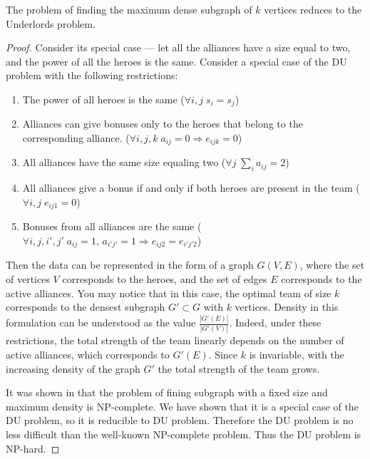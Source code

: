 \documentclass[smallextended]{svjour3}       %
\begin{document}
\begin{theorem}
\label{MEWC_DU}
The problem of finding the maximum dense subgraph of $k$ vertices reduces to the Underlords problem.
\end{theorem}
\begin{proof}

Consider its special case --- let all the alliances have a size equal to two, and the power of all the heroes is the same. Consider a special case of the DU problem with the following restrictions:

\begin{enumerate}
    \item The power of all heroes is the same ($\forall i, j \; s_i=s_j$)
    \item Alliances can give bonuses only to the heroes that belong to the corresponding alliance. ($\forall i, j, k \; a_{ij}=0 \Longrightarrow e_{ijk} = 0$)
    
    \item All alliances have the same size equaling two ($\forall j \; \sum_i a_{ij}=2 $)
    \item All alliances give a bonus if and only if both heroes are present in the team ($\forall i, j \; e_{ij1}=0$)
    \item Bonuses from all alliances are the same ($\forall i, j, i', j' \; a_{ij}=1,\, a_{i' j'}=1 \Longrightarrow e_{ij2}=e_{i' j' 2}$)
\end{enumerate}

Then the data can be represented in the form of a graph $G(V, E) $, where the set of vertices $ V $ corresponds to the heroes, and the set of edges $E$ corresponds to the active alliances. You may notice that in this case, the optimal team of size $ k $ corresponds to the densest subgraph $ G' \subset G $ with $ k $ vertices. Density in this formulation can be understood as the value $ \frac{|G'(E)|}{|G'(V)|} $. Indeed, under these restrictions, the total strength of the team linearly depends on the number of active alliances, which corresponds to $ G'(E)$. Since $ k $ is invariable, with the increasing density of the graph $ G '$ the total strength of the team grows.

It was shown in \cite{downey1995fixed} that the problem of fining subgraph with a fixed size and maximum density is NP-complete. We have shown that it is a special case of the DU problem, so it is reducible to DU problem. Therefore the DU problem is no less difficult than the well-known NP-complete problem. Thus the DU problem is NP-hard.

\end{proof}
\end{document}
